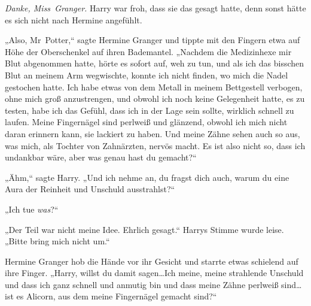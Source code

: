 \emph{Danke, Miss~Granger.}
Harry war froh, dass sie das gesagt hatte, denn sonst hätte es sich nicht nach Hermine angefühlt.

„Also, Mr~Potter,“ sagte Hermine Granger und tippte mit den Fingern etwa auf Höhe der Oberschenkel auf ihren Bademantel. „Nachdem die Medizinhexe mir Blut abgenommen hatte, hörte es sofort auf, weh zu tun, und als ich das bisschen Blut an meinem Arm wegwischte, konnte ich nicht finden, wo mich die Nadel gestochen hatte. Ich habe etwas von dem Metall in meinem Bettgestell verbogen, ohne mich groß anzustrengen, und obwohl ich noch keine Gelegenheit hatte, es zu testen, habe ich das Gefühl, dass ich in der Lage sein sollte, wirklich schnell zu laufen. Meine Fingernägel sind perlweiß und glänzend, obwohl ich mich nicht daran erinnern kann, sie lackiert zu haben. Und meine Zähne sehen auch so aus, was mich, als Tochter von Zahnärzten, nervös macht. Es ist also nicht so, dass ich undankbar wäre, aber was genau hast du gemacht?“

„Ähm,“ sagte Harry. „Und ich nehme an, du fragst dich auch, warum du eine Aura der Reinheit und Unschuld ausstrahlst?“

„Ich tue \emph{was}?“

„Der Teil war nicht meine Idee. Ehrlich gesagt.“ Harrys Stimme wurde leise. „Bitte bring mich nicht um.“

Hermine Granger hob die Hände vor ihr Gesicht und starrte etwas schielend auf ihre Finger. „Harry, willst du damit sagen…Ich meine, meine strahlende Unschuld und dass ich ganz schnell und anmutig bin und dass meine Zähne perlweiß sind…ist es Alicorn, aus dem meine Fingernägel gemacht sind?“

